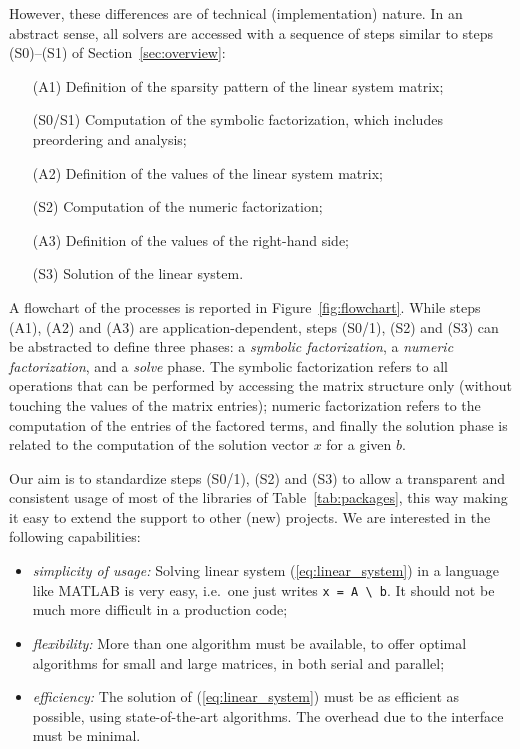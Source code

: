 \documentclass[acmtocl]{acmtrans2m}
\begin{document}
However, these differences are of technical (implementation) nature. In
an abstract sense, all solvers are accessed with a sequence of
steps similar to steps (S0)--(S1) of Section~\ref{sec:overview}:
\begin{enumerate}
\item[(A1)] Definition of the sparsity pattern of the linear system matrix;
\item[(S0/S1)] Computation of the symbolic factorization, which includes
preordering and analysis;
\item[(A2)] Definition of the values of the linear system matrix;
\item[(S2)] Computation of the numeric factorization;
\item[(A3)] Definition of the values of the right-hand side;
\item[(S3)] Solution of the linear system.
\end{enumerate}
A flowchart of the processes is reported in Figure~\ref{fig:flowchart}.
While steps (A1), (A2) and (A3) are application-dependent, steps (S0/1), (S2) and
(S3) can be abstracted to define three phases: a {\sl symbolic
factorization}, a {\sl numeric factorization}, and a {\sl solve} phase. The
symbolic factorization refers to all operations that can be performed by
accessing the matrix structure only (without touching the values of the matrix entries);
numeric factorization refers to the computation of the entries of the
factored terms, and
finally the solution phase is related to the computation of the solution vector
$x$ for a given $b$.

Our aim is to standardize steps (S0/1), (S2)
and (S3) to allow a transparent and consistent usage
of most of the libraries of Table~\ref{tab:packages}, this way making it easy
to extend the support to other (new) projects. We are interested in the
following capabilities:
\begin{itemize}

\item {\sl simplicity of usage:} Solving linear system (\ref{eq:linear_system}) in a language
like MATLAB is very easy, i.e.~one just writes \verb!x = A \ b!. It should not be much
more difficult in a production code;

\item {\sl flexibility:} More than one algorithm must be available,
  to offer optimal algorithms for small and large matrices, in both serial and
  parallel;

\item {\sl efficiency:} The solution of (\ref{eq:linear_system}) must be as
efficient as possible, using state-of-the-art algorithms. The
overhead due to the interface must be minimal.
\end{itemize}
\end{document}
